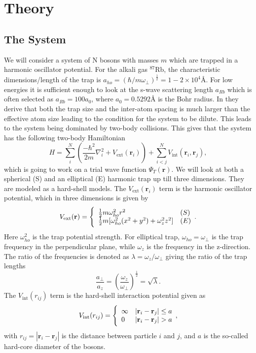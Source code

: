 \documentclass[12pt,a4paper,english]{article}
\begin{document}
\section{Theory}
\label{sect:Theory}
\subsection{The System}
\label{subsect:System}
We will consider a system of N bosons with masses $m$ which are trapped in a harmonic oscillator potential. For the alkali gas $^{87}$Rb, the characteristic dimensions/length of the trap is $a_{ho}=(\hbar/m\omega_{\perp})^{\frac{1}{2}}=1-2\times10^4$Å. For low energies it is sufficient enough to look at the s-wave scattering length $a_{Rb}$ which is often selected as $a_{Rb}=100a_0$, where $a_0=0.5292$Å is the Bohr radius. In \citet{dubois2001bose} they derive that both the trap size and the inter-atom spacing is much larger than the effective atom size leading to the condition for the system to be dilute. This leads to the system being dominated by two-body collisions. This gives that the system has the following two-body Hamiltonian
\begin{equation}
\label{eq:sys_Hamiltonian}
H=\sum_i^N\left(\frac{-\hbar^2}{2m}\nabla_i^2+V_{\text{ext}}(\textbf{r}_i)\right)+\sum_{i<j}^{N}V_{\text{int}}(\textbf{r}_i,\textbf{r}_j),
\end{equation}
which is going to work on a trial wave function $\Psi_T(\textbf{r})$. We will look at both a spherical (S) and an elliptical (E) harmonic trap up till three dimensions. They are modeled as a hard-shell models. The $V_{\text{ext}}(\textbf{r}_i)$ term is the harmonic oscillator potential, which in three dimensions is given by
\begin{equation}
\label{eq:V_ext}
V_{\text{ext}}(\textbf{r})= \Bigg\{
\begin{array}{ll}
\frac{1}{2}m\omega_{ho}^2r^2 & (S)\\
\strut
\frac{1}{2}m[\omega_{ho}^2(x^2+y^2) + \omega_z^2z^2] & (E)
\end{array}.
\end{equation}
Here $\omega_{ho}^2$ is the trap potential strength. For elliptical trap, $\omega_{ho}=\omega_{\perp}$ is the trap frequency in the perpendicular plane, while $\omega_z$ is the frequency in the z-direction. The ratio of the frequencies is denoted as $\lambda=\omega_z/\omega_{\perp}$ giving the ratio of the trap lengths 
\begin{equation*}
\frac{a_{\perp}}{a_z}=\left(\frac{\omega_z}{\omega_{\perp}}\right)^{\frac{1}{2}}=\sqrt{\lambda}.
\end{equation*} 
The $V_{\text{int}}(r_{ij})$ term is the hard-shell interaction potential given as
\begin{equation}
\label{eq:V_int}
V_{\text{int}}(r_{ij})= \Bigg\{
\begin{array}{ll}
\infty & |\textbf{r}_i-\textbf{r}_j|\leq a\\
\strut
0 & |\textbf{r}_i-\textbf{r}_j|> a
\end{array},
\end{equation}
with $r_{ij}=|\textbf{r}_i-\textbf{r}_j|$ is the distance between particle $i$ and $j$, and $a$ is the so-called hard-core diameter of the bosons.
\end{document}
